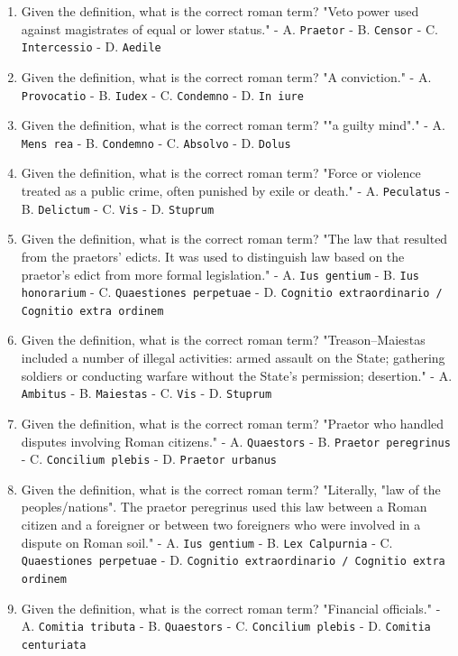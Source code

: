 \documentclass[11pt]{article}
\begin{document}
\begin{enumerate}
\item Given the definition, what is the correct roman term? "Veto power used against magistrates of equal or lower status." - A. \texttt{Praetor} - B. \texttt{Censor} - C. \texttt{Intercessio} - D. \texttt{Aedile}
\item Given the definition, what is the correct roman term? "A conviction." - A. \texttt{Provocatio} - B. \texttt{Iudex} - C. \texttt{Condemno} - D. \texttt{In iure}
\item Given the definition, what is the correct roman term? ""a guilty mind"." - A. \texttt{Mens rea} - B. \texttt{Condemno} - C. \texttt{Absolvo} - D. \texttt{Dolus}
\item Given the definition, what is the correct roman term? "Force or violence treated as a public crime, often punished by exile or death." - A. \texttt{Peculatus} - B. \texttt{Delictum} - C. \texttt{Vis} - D. \texttt{Stuprum}
\item Given the definition, what is the correct roman term? "The law that resulted from the praetors' edicts. It was used to distinguish law based on the praetor's edict from more formal legislation." - A. \texttt{Ius gentium} - B. \texttt{Ius honorarium} - C. \texttt{Quaestiones perpetuae} - D. \texttt{Cognitio extraordinario / Cognitio extra ordinem}
\item Given the definition, what is the correct roman term? "Treason--Maiestas included a number of illegal activities: armed assault on the State; gathering soldiers or conducting warfare without the State's permission; desertion." - A. \texttt{Ambitus} - B. \texttt{Maiestas} - C. \texttt{Vis} - D. \texttt{Stuprum}
\item Given the definition, what is the correct roman term? "Praetor who handled disputes involving Roman citizens." - A. \texttt{Quaestors} - B. \texttt{Praetor peregrinus} - C. \texttt{Concilium plebis} - D. \texttt{Praetor urbanus}
\item Given the definition, what is the correct roman term? "Literally, "law of the peoples/nations". The praetor peregrinus used this law between a Roman citizen and a foreigner or between two foreigners who were involved in a dispute on Roman soil." - A. \texttt{Ius gentium} - B. \texttt{Lex Calpurnia} - C. \texttt{Quaestiones perpetuae} - D. \texttt{Cognitio extraordinario / Cognitio extra ordinem}
\item Given the definition, what is the correct roman term? "Financial officials." - A. \texttt{Comitia tributa} - B. \texttt{Quaestors} - C. \texttt{Concilium plebis} - D. \texttt{Comitia centuriata}

\end{enumerate}
\end{document}
